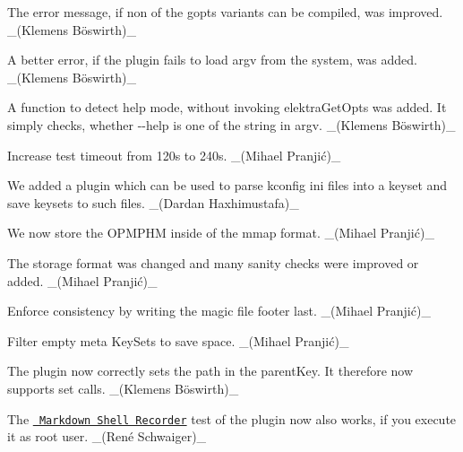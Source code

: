 \begin{DoxyItemize}
\item The error message, if non of the gopts variants can be compiled, was improved. \+\_\+(Klemens Böswirth)\+\_\+
\item A better error, if the plugin fails to load {\ttfamily argv} from the system, was added. \+\_\+(Klemens Böswirth)\+\_\+
\item A function to detect help mode, without invoking {\ttfamily elektra\+Get\+Opts} was added. It simply checks, whether {\ttfamily -\/-\/help} is one of the string in {\ttfamily argv}. \+\_\+(Klemens Böswirth)\+\_\+
\item Increase test timeout from 120s to 240s. \+\_\+(Mihael Pranjić)\+\_\+
\end{DoxyItemize}


\begin{DoxyItemize}
\item We added a plugin which can be used to parse kconfig ini files into a keyset and save keysets to such files. \+\_\+(\+Dardan Haxhimustafa)\+\_\+
\end{DoxyItemize}


\begin{DoxyItemize}
\item We now store the O\+P\+M\+P\+HM inside of the mmap format. \+\_\+(Mihael Pranjić)\+\_\+
\item The storage format was changed and many sanity checks were improved or added. \+\_\+(Mihael Pranjić)\+\_\+
\item Enforce consistency by writing the magic file footer last. \+\_\+(Mihael Pranjić)\+\_\+
\item Filter empty meta Key\+Sets to save space. \+\_\+(Mihael Pranjić)\+\_\+
\end{DoxyItemize}


\begin{DoxyItemize}
\item The plugin now correctly sets the path in the {\ttfamily parent\+Key}. It therefore now supports set calls. \+\_\+(Klemens Böswirth)\+\_\+
\end{DoxyItemize}


\begin{DoxyItemize}
\item The \href{https://master.libelektra.org/tests/shell/shell_recorder/tutorial_wrapper}{\texttt{ Markdown Shell Recorder}} test of the plugin now also works, if you execute it as root user. \+\_\+(René Schwaiger)\+\_\+
\end{DoxyItemize}


